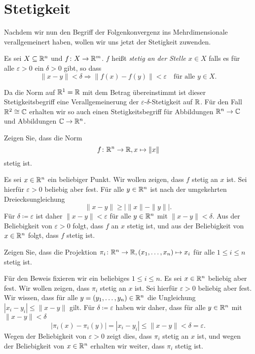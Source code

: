 \documentclass[a4paper,10pt]{article}
\begin{document}
\section{Stetigkeit}


Nachdem wir nun den Begriff der Folgenkonvergenz ins Mehrdimensionale verallgemeinert haben, wollen wir uns jetzt der Stetigkeit zuwenden.


\begin{defi}
 Es sei $X \subseteq \mathbb{R}^n$ und $f \colon X \to \mathbb{R}^m$. $f$ heißt \emph{stetig an der Stelle $x \in X$} falls es für alle $\varepsilon > 0$ ein $\delta > 0$ gibt, so dass
 \[
  \|x-y\| < \delta \Rightarrow \|f(x)-f(y)\| < \varepsilon \quad \text{für alle $y \in X$}.
 \]
\end{defi}


Da die Norm auf $\mathbb{R}^1 = \mathbb{R}$ mit dem Betrag übereinstimmt ist dieser Stetigkeitsbegriff eine Verallgemeinerung der $\varepsilon$-$\delta$-Stetigkeit auf $\mathbb{R}$. Für den Fall $\mathbb{R}^2 \cong \mathbb{C}$ erhalten wir so auch einen Stetigkeitsbegriff für Abbildungen $\mathbb{R}^n \to \mathbb{C}$ und Abbildungen $\mathbb{C} \to \mathbb{R}^n$.


\begin{question}
 Zeigen Sie, dass die Norm
 \[
  f \colon \mathbb{R}^n \to \mathbb{R}, x \mapsto \|x\|
 \]
 stetig ist.
\end{question}
\begin{solution}
 Es sei $x \in \mathbb{R}^n$ ein beliebiger Punkt. Wir wollen zeigen, dass $f$ stetig an $x$ ist. Sei hierfür $\varepsilon > 0$ beliebig aber fest. Für alle $y \in \mathbb{R}^n$ ist nach der umgekehrten Dreiecksungleichung
 \[
  \|x-y\| \geq |\|x\|-\|y\||.
 \]
 Für $\delta \coloneqq \varepsilon$ ist daher $\|x-y\| < \varepsilon$ für alle $y \in \mathbb{R}^n$ mit $\|x-y\| < \delta$. Aus der Beliebigkeit von $\varepsilon > 0$ folgt, dass $f$ an $x$ stetig ist, und aus der Beliebigkeit von $x \in \mathbb{R}^n$ folgt, dass $f$ stetig ist.
\end{solution}


\begin{question}
 Zeigen Sie, dass die Projektion $\pi_i \colon \mathbb{R}^n \to \mathbb{R}, (x_1, \dotsc, x_n) \mapsto x_i$ für alle $1 \leq i \leq n$ stetig ist.
\end{question}
\begin{solution}
 Für den Beweis fixieren wir ein beliebiges $1 \leq i \leq n$. Es sei $x \in \mathbb{R}^n$ beliebig aber fest. Wir wollen zeigen, dass $\pi_i$ stetig an $x$ ist. Sei hierfür $\varepsilon > 0$ beliebig aber fest. Wir wissen, dass für alle $y = (y_1, \dotsc, y_n) \in \mathbb{R}^n$ die Ungleichung $|x_i - y_i| \leq \|x-y\|$ gilt. Für $\delta \coloneqq \varepsilon$ haben wir daher, dass für alle $y \in \mathbb{R}^n$ mit $\|x-y\| < \delta$
 \[
  |\pi_i(x)-\pi_i(y)| = |x_i - y_i| \leq \|x-y\| < \delta = \varepsilon.
 \]
 Wegen der Beliebigkeit von $\varepsilon > 0$ zeigt dies, dass $\pi_i$ stetig an $x$ ist, und wegen der Beliebigkeit von $x \in \mathbb{R}^n$ erhalten wir weiter, dass $\pi_i$ stetig ist.
\end{solution}
\end{document}
